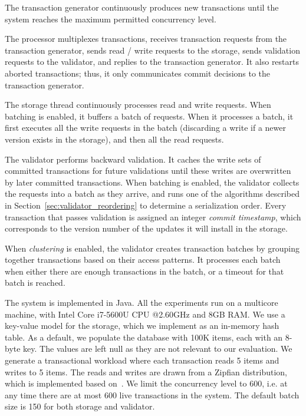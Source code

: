 The transaction generator continuously produces new transactions until the system reaches the maximum permitted concurrency level. 

The processor multiplexes transactions, receives transaction requests from the transaction generator, sends read / write requests to the storage, sends validation requests to the validator, and replies to the transaction generator. It also restarts aborted transactions; thus, it only communicates commit decisions to the transaction generator. 

The storage thread continuously processes read and write requests. When batching is enabled, it buffers a batch of requests. When it processes a batch, it first executes all the write requests in the batch (discarding a write if a newer version exists in the storage), and then all the read requests.

The validator performs backward validation. It caches the write sets of committed transactions for future validations until these writes are overwritten by later committed transactions. 
When batching is enabled, the validator collects the requests into a batch as they arrive, and runs one of the algorithms described in Section~\ref{sec:validator_reordering} to determine a serialization order. Every transaction that passes validation is assigned an integer \emph{commit timestamp}, which corresponds to the version number of the updates it will install in the storage.

When \emph{clustering} is enabled, the validator creates transaction batches by grouping together transactions based on their access patterns. It processes each batch when either there are enough transactions in the batch, or a timeout for that batch is reached.

The system is implemented in Java. All the experiments run on a multicore machine, with Intel Core i7-5600U CPU @2.60GHz and 8GB RAM. We use a key-value model for the storage, which we implement as an in-memory hash table. As a default, we populate the database with 100K items, each with an 8-byte key. The values are left null as they are not relevant to our evaluation. We generate a transactional workload where each transaction reads 5 items and writes to 5 items. The reads and writes are drawn from a Zipfian distribution, which is implemented based on~\cite{gray1994quickly}. We limit the concurrency level to 600, i.e. at any time there are at most 600 live transactions in the system. The default batch size is 150 for both storage and validator.

